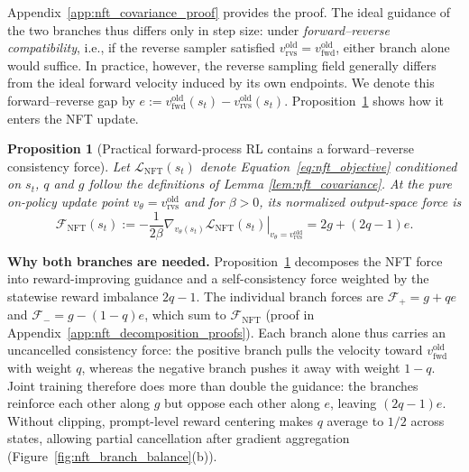 \documentclass{article}
\newtheorem{proposition}{Proposition}
\begin{document}
Appendix~\ref{app:nft_covariance_proof} provides the proof. The ideal guidance of the two branches thus differs only in step size: under \emph{forward--reverse compatibility}, i.e., if the reverse sampler satisfied $v_{\mathrm{rvs}}^{\mathrm{old}}=v_{\mathrm{fwd}}^{\mathrm{old}}$, either branch alone would suffice. In practice, however, the reverse sampling field generally differs from the ideal forward velocity induced by its own endpoints. We denote this forward--reverse gap by $e:=v_{\mathrm{fwd}}^{\mathrm{old}}(s_t)-v_{\mathrm{rvs}}^{\mathrm{old}}(s_t)$. Proposition~\ref{prop:nft_contamination} shows how it enters the NFT update.

\begin{proposition}[Practical forward-process RL contains a forward--reverse consistency force]
\label{prop:nft_contamination}
Let $\mathcal L_{\mathrm{NFT}}(s_t)$ denote
Equation~\ref{eq:nft_objective} conditioned on $s_t$, $q$ and $g$ follow the definitions of Lemma \ref{lem:nft_covariance}. At the pure on-policy
update point $v_\theta=v_{\mathrm{rvs}}^{\mathrm{old}}$ and for $\beta>0$,
its normalized output-space force is
\begin{equation}
\mathcal F_{\mathrm{NFT}}(s_t)
:=-\frac{1}{2\beta}
\left.\nabla_{v_\theta(s_t)}\mathcal L_{\mathrm{NFT}}(s_t)
\right|_{v_\theta=v_{\mathrm{rvs}}^{\mathrm{old}}}
=2g+(2q-1)e.
\label{eq:nft_force_decomposition}
\end{equation}
\end{proposition}
\noindent\textbf{Why both branches are needed.} Proposition~\ref{prop:nft_contamination} decomposes the NFT force into reward-improving guidance and a self-consistency force weighted by the statewise reward imbalance $2q-1$. The individual branch forces are $\mathcal F_+=g+qe$ and $\mathcal F_-=g-(1-q)e$, which sum to $\mathcal F_{\mathrm{NFT}}$ (proof in Appendix~\ref{app:nft_decomposition_proofs}). Each branch alone thus carries an uncancelled consistency force: the positive branch pulls the velocity toward $v_{\mathrm{fwd}}^{\mathrm{old}}$ with weight $q$, whereas the negative branch pushes it away with weight $1-q$. Joint training therefore does more than double the guidance: the branches reinforce each other along $g$ but oppose each other along $e$, leaving $(2q-1)e$. Without clipping, prompt-level reward centering makes $q$ average to $1/2$ across states, allowing partial cancellation after gradient aggregation (Figure~\ref{fig:nft_branch_balance}(b)).
\end{document}
